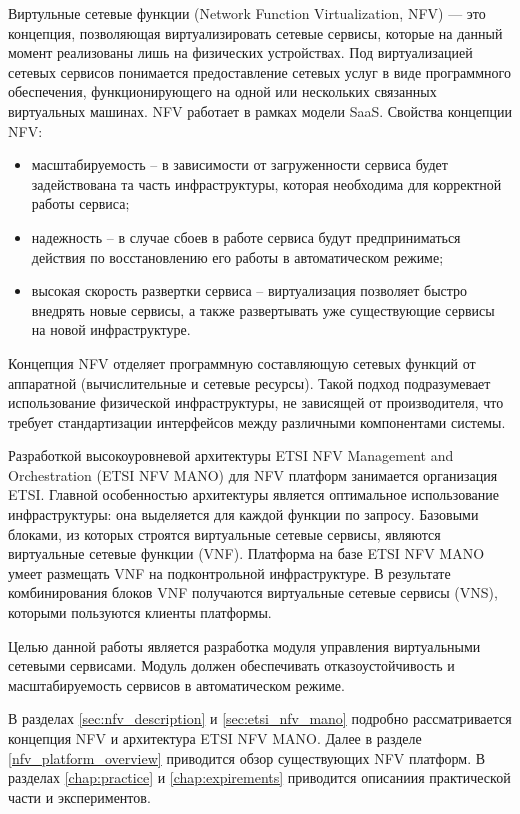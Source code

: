\documentclass[oneside,final,14pt,a4paper]{extreport}
\begin{document}
Виртульные сетевые функции (Network Function Virtualization, NFV) --- это концепция, позволяющая виртуализировать сетевые сервисы, которые на данный момент реализованы лишь на физических устройствах. Под виртуализацией сетевых сервисов понимается предоставление сетевых услуг в виде программного обеспечения, функционирующего на одной или нескольких связанных виртуальных машинах. NFV работает в рамках модели SaaS. Свойства концепции NFV:
\begin{itemize}
	\item масштабируемость -- в зависимости от загруженности сервиса будет задействована та часть инфраструктуры, которая необходима для корректной работы сервиса;
	\item надежность -- в случае сбоев в работе сервиса будут предприниматься действия по восстановлению его работы в автоматическом режиме;
	\item высокая скорость развертки сервиса -- виртуализация позволяет быстро внедрять новые сервисы, а также развертывать уже существующие сервисы на новой инфраструктуре.
\end{itemize}

Концепция NFV отделяет программную составляющую сетевых функций от аппаратной (вычислительные и сетевые ресурсы). Такой подход подразумевает использование физической инфраструктуры, не зависящей от производителя, что требует стандартизации интерфейсов между различными компонентами системы.

Разработкой высокоуровневой архитектуры ETSI NFV Management and Orchestration (ETSI NFV MANO) для  NFV платформ занимается организация ETSI. Главной особенностью архитектуры является оптимальное использование инфраструктуры: она выделяется для каждой функции по запросу. Базовыми блоками, из которых строятся виртуальные сетевые сервисы, являются виртуальные сетевые функции (VNF). Платформа на базе ETSI NFV MANO умеет размещать VNF на подконтрольной инфраструктуре. В результате комбинирования блоков VNF получаются виртуальные сетевые сервисы (VNS), которыми пользуются клиенты платформы.

Целью данной работы является разработка модуля управления виртуальными сетевыми сервисами. Модуль должен обеспечивать отказоустойчивость и масштабируемость сервисов в автоматическом режиме.

В разделах \ref{sec:nfv_description} и \ref{sec:etsi_nfv_mano} подробно рассматривается концепция NFV и архитектура ETSI NFV MANO. Далее в разделе \ref{nfv_platform_overview} приводится обзор существующих NFV платформ. В разделах \ref{chap:practice} и \ref{chap:expirements} приводится описаниия практической части и экспериментов.
\end{document}
